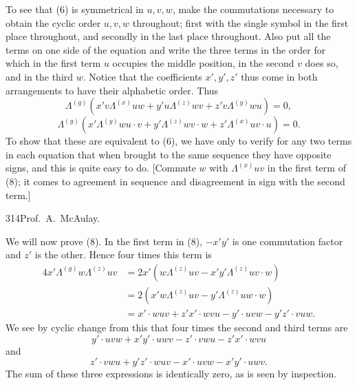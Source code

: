 \documentclass[11pt]{article}
\begin{document}
\indent To see that (6) is symmetrical in $u,v,w$, make the commutations necessary to obtain the cyclic order $u,v,w$ throughout; first with the single symbol in the first place throughout, and secondly in the last place throughout. Also put all the terms on one side of the equation and write the three terms in the order for which in the first term $u$ occupies the middle position, in the second $v$ does so, and in the third $w$. Notice that the coefficients $x',y',z'$ thus come in both arrangements to have their alphabetic order. Thus
\begin{equation}\Lambda^{(g)}(x'v\Lambda^{(x)}uw+y'u\Lambda^{(z)}wv+z'v\Lambda^{(y)}wu)=0,\tag{8}\end{equation}
\begin{equation}\Lambda^{(g)}(x'\Lambda^{(y)}wu\cdot v+y'\Lambda^{(z)}wv\cdot w+z'\Lambda^{(x)}uv\cdot u)=0.\tag{9}\end{equation}
To show that these are equivalent to (6), we have only to verify for any two terms in each equation that when brought to the same sequence they have opposite signs, and this is quite easy to do. [Commute $w$ with $\Lambda^{(x)}uv$ in the first term of (8); it comes to agreement in sequence and disagreement in sign with the second term.]

\newpage\thispagestyle{empty}\begin{center}314\hfill Prof.\ A.\ McAulay.\end{center}
\indent We will now prove (8). In the first term in (8), $-x'y'$ is one commutation factor and $z'$ is the other. Hence four times this term is
\[\begin{aligned}4x'\Lambda^{(g)}w\Lambda^{(z)}uv&=2x'(w\Lambda^{(z)}uv-x'y'\Lambda^{(z)}uv\cdot w)\\&=2(x'w\Lambda^{(z)}uv-y'\Lambda^{(z)}uw\cdot w)\\&=x'\cdot wuv+z'x'\cdot wvu-y'\cdot uvw-y'z'\cdot vuw.\end{aligned}\]
We see by cyclic change from this that four times the second and third terms are
\[y'\cdot uvw+x'y'\cdot uwv-z'\cdot vwu-z'x'\cdot wvu\]
and
\[z'\cdot vwu+y'z'\cdot wuv-x'\cdot uvw-x'y'\cdot uwv.\]
The sum of these three expressions is identically zero, as is seen by inspection.
\end{document}

